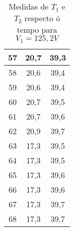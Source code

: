 \documentclass[12pt, a4paper, titlepage]{article}
\begin{document}
\begin{table}[H]
\begin{minipage}[c]{0,4\textwidth}
\begin{table}[H]
\begin{tabular}{|c|c|c|}
        57 & 20,7  & 39,3  \\ \hline
        58 & 20,6  & 39,4  \\ \hline
        59 & 20,6  & 39,4  \\ \hline
        60 & 20,7  & 39,5  \\ \hline
        61 & 20,7  & 39,6  \\ \hline
        62 & 20,9  & 39,7  \\ \hline
        63 & 17,3  & 39,5  \\ \hline
        64 & 17,3  & 39,5  \\ \hline
        65 & 17,3  & 39,6  \\ \hline
        66 & 17,3  & 39,6  \\ \hline
        67 & 17,3  & 39,7  \\ \hline
        68 & 17,3  & 39,7  \\ \hline
        \end{tabular}
      \end{table}
    \end{minipage}
    \caption{Medidas de $T_1$ e $T_2$ respecto ó tempo para $V_1 = 125,2V$}
  \end{table}
\end{document}
